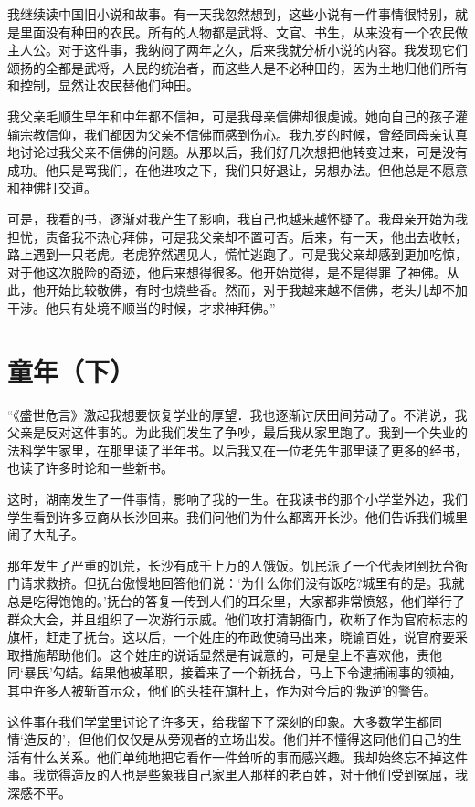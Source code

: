 \documentclass[10pt]{book}
\begin{document}
我继续读中国旧小说和故事。有一天我忽然想到，这些小说有一件事情很特别，就是里面没有种田的农民。所有的人物都是武将、文官、书生，从来没有一个农民做主人公。对于这件事，我纳闷了两年之久，后来我就分析小说的内容。我发现它们颂扬的全都是武将，人民的统治者，而这些人是不必种田的，因为土地归他们所有和控制，显然让农民替他们种田。

我父亲毛顺生早年和中年都不信神，可是我母亲信佛却很虔诚。她向自己的孩子灌输宗教信仰，我们都因为父亲不信佛而感到伤心。我九岁的时候，曾经同母亲认真地讨论过我父亲不信佛的问题。从那以后，我们好几次想把他转变过来，可是没有成功。他只是骂我们，在他进攻之下，我们只好退让，另想办法。但他总是不愿意和神佛打交道。

可是，我看的书，逐渐对我产生了影响，我自己也越来越怀疑了。我母亲开始为我担忧，责备我不热心拜佛，可是我父亲却不置可否。后来，有一天，他出去收帐，路上遇到一只老虎。老虎猝然遇见人，慌忙逃跑了。可是我父亲却感到更加吃惊，对于他这次脱险的奇迹，他后来想得很多。他开始觉得，是不是得罪 了神佛。从此，他开始比较敬佛，有时也烧些香。然而，对于我越来越不信佛，老头儿却不加干涉。他只有处境不顺当的时候，才求神拜佛。”



\section{童年（下）}

“《盛世危言》激起我想要恢复学业的厚望．我也逐渐讨厌田间劳动了。不消说，我父亲是反对这件事的。为此我们发生了争吵，最后我从家里跑了。我到一个失业的法科学生家里，在那里读了半年书。以后我又在一位老先生那里读了更多的经书，也读了许多时论和一些新书。

这时，湖南发生了一件事情，影响了我的一生。在我读书的那个小学堂外边，我们学生看到许多豆商从长沙回来。我们问他们为什么都离开长沙。他们告诉我们城里闹了大乱子。

那年发生了严重的饥荒，长沙有成千上万的人饿饭。饥民派了一个代表团到抚台衙门请求救挤。但抚台傲慢地回答他们说：‘为什么你们没有饭吃?城里有的是。我就总是吃得饱饱的。’抚台的答复一传到人们的耳朵里，大家都非常愤怒，他们举行了群众大会，并且组织了一次游行示威。他们攻打清朝衙门，砍断了作为官府标志的旗杆，赶走了抚台。这以后，一个姓庄的布政使骑马出来，晓谕百姓，说官府要采取措施帮助他们。这个姓庄的说话显然是有诚意的，可是皇上不喜欢他，责他同‘暴民’勾结。结果他被革职，接着来了一个新抚台，马上下令逮捕闹事的领袖，其中许多人被斩首示众，他们的头挂在旗杆上，作为对今后的‘叛逆’的警告。

这件事在我们学堂里讨论了许多天，给我留下了深刻的印象。大多数学生都同情‘造反的’，但他们仅仅是从旁观者的立场出发。他们并不懂得这同他们自己的生活有什么关系。他们单纯地把它看作一件耸听的事而感兴趣。我却始终忘不掉这件事。我觉得造反的人也是些象我自己家里人那样的老百姓，对于他们受到冤屈，我深感不平。
\end{document}
